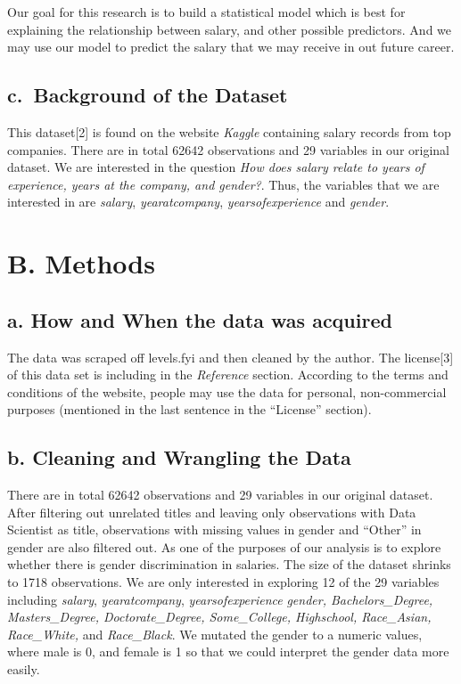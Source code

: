 \documentclass[
]{article}
\begin{document}
Our goal for this research is to build a statistical model which is best
for explaining the relationship between salary, and other possible
predictors. And we may use our model to predict the salary that we may
receive in out future career.

\hypertarget{c.-background-of-the-dataset}{%
\subsection{c.~Background of the
Dataset}\label{c.-background-of-the-dataset}}

This dataset{[}2{]} is found on the website \emph{Kaggle} containing
salary records from top companies. There are in total 62642 observations
and 29 variables in our original dataset. We are interested in the
question \emph{How does salary relate to years of experience, years at
the company, and gender?}. Thus, the variables that we are interested in
are \emph{salary}, \emph{yearatcompany}, \emph{yearsofexperience} and
\emph{gender}.

\newpage

\hypertarget{b.-methods}{%
\section{B. Methods}\label{b.-methods}}

\hypertarget{a.-how-and-when-the-data-was-acquired}{%
\subsection{a. How and When the data was
acquired}\label{a.-how-and-when-the-data-was-acquired}}

The data was scraped off levels.fyi and then cleaned by the author. The
license{[}3{]} of this data set is including in the \emph{Reference}
section. According to the terms and conditions of the website, people
may use the data for personal, non-commercial purposes (mentioned in the
last sentence in the ``License'' section).

\hypertarget{b.-cleaning-and-wrangling-the-data}{%
\subsection{b. Cleaning and Wrangling the
Data}\label{b.-cleaning-and-wrangling-the-data}}

There are in total 62642 observations and 29 variables in our original
dataset. After filtering out unrelated titles and leaving only
observations with Data Scientist as title, observations with missing
values in gender and ``Other'' in gender are also filtered out. As one
of the purposes of our analysis is to explore whether there is gender
discrimination in salaries. The size of the dataset shrinks to 1718
observations. We are only interested in exploring 12 of the 29 variables
including \emph{salary}, \emph{yearatcompany}, \emph{yearsofexperience}
\emph{gender, Bachelors\_Degree, Masters\_Degree, Doctorate\_Degree,
Some\_College, Highschool, Race\_Asian, Race\_White,} and
\emph{Race\_Black}. We mutated the gender to a numeric values, where
male is 0, and female is 1 so that we could interpret the gender data
more easily.
\end{document}
